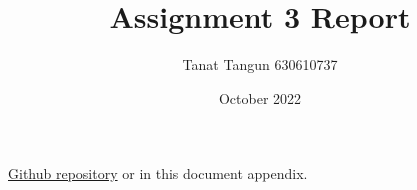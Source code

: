 \documentclass{article}
\title{
Assignment 3 Report
}
\author{Tanat Tangun 630610737}
\date{October 2022}
\begin{document}
\maketitle
\href{https://github.com/RiwEZ/MLPOnRust}{Github repository} or in this document appendix.
\end{document}

